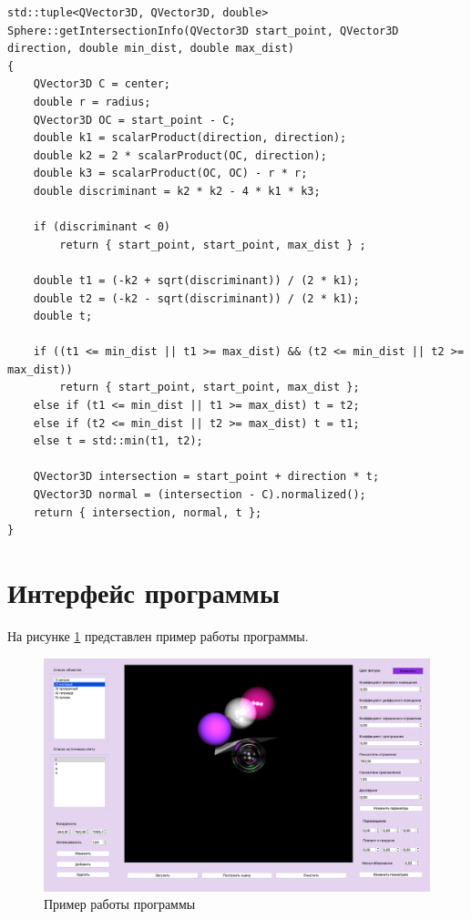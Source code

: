 \begin{center}
\captionsetup{justification=raggedright,singlelinecheck=off}
\begin{lstlisting}[label=lst:s,caption=Поиск пересечения луча со сферой,basicstyle=\ttfamily\footnotesize]
std::tuple<QVector3D, QVector3D, double> Sphere::getIntersectionInfo(QVector3D start_point, QVector3D direction, double min_dist, double max_dist)
{
    QVector3D C = center;
    double r = radius;
    QVector3D OC = start_point - C;
    double k1 = scalarProduct(direction, direction);
    double k2 = 2 * scalarProduct(OC, direction);
    double k3 = scalarProduct(OC, OC) - r * r;
    double discriminant = k2 * k2 - 4 * k1 * k3;

    if (discriminant < 0)
        return { start_point, start_point, max_dist } ;

    double t1 = (-k2 + sqrt(discriminant)) / (2 * k1);
    double t2 = (-k2 - sqrt(discriminant)) / (2 * k1);
    double t;

    if ((t1 <= min_dist || t1 >= max_dist) && (t2 <= min_dist || t2 >= max_dist))
        return { start_point, start_point, max_dist };
    else if (t1 <= min_dist || t1 >= max_dist) t = t2;
    else if (t2 <= min_dist || t2 >= max_dist) t = t1;
    else t = std::min(t1, t2);

    QVector3D intersection = start_point + direction * t;
    QVector3D normal = (intersection - C).normalized();
    return { intersection, normal, t };
}
\end{lstlisting}
\end{center}

\clearpage

\section{Интерфейс программы}

На рисунке \ref{img:interface} представлен пример работы программы.

\begin{figure}[h]
	\begin{center}
		\includegraphics[width=\linewidth]{img/interface.png}
	\end{center}
	\captionsetup{justification=centering}
	\caption{Пример работы программы}
	\label{img:interface}
\end{figure}

